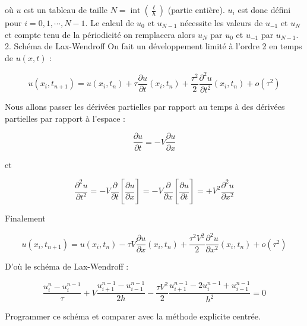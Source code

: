 \documentclass[10pt]{article}
\begin{document}
où \(u\) est un tableau de taille \(N=\operatorname{int}\left(\frac{\ell}{h}\right)\) (partie entière). \(u_{i}\) est donc défini pour \(i= 0,1, \cdots, N-1\). Le calcul de \(u_{0}\) et \(u_{N-1}\) nécessite les valeurs de \(u_{-1}\) et \(u_{N}\) et compte tenu de la périodicité on remplacera alors \(u_{N}\) par \(u_{0}\) et \(u_{-1}\) par \(u_{N-1}\).\\
2. Schéma de Lax-Wendroff On fait un développement limité à l'ordre 2 en temps de \(u(x, t)\) :

\[
u\left(x_{i}, t_{n+1}\right)=u\left(x_{i}, t_{n}\right)+\tau \frac{\partial u}{\partial t}\left(x_{i}, t_{n}\right)+\frac{\tau^{2}}{2} \frac{\partial^{2} u}{\partial t^{2}}\left(x_{i}, t_{n}\right)+o\left(\tau^{2}\right)
\]

Nous allons passer les dérivées partielles par rapport au temps à des dérivées partielles par rapport à l'espace :

\[
\frac{\partial u}{\partial t}=-V \frac{\partial u}{\partial x}
\]

et

\[
\frac{\partial^{2} u}{\partial t^{2}}=-V \frac{\partial}{\partial t}\left[\frac{\partial u}{\partial x}\right]=-V \frac{\partial}{\partial x}\left[\frac{\partial u}{\partial t}\right]=+V^{2} \frac{\partial^{2} u}{\partial x^{2}}
\]

Finalement

\[
u\left(x_{i}, t_{n+1}\right)=u\left(x_{i}, t_{n}\right)-\tau V \frac{\partial u}{\partial x}\left(x_{i}, t_{n}\right)+\frac{\tau^{2} V^{2}}{2} \frac{\partial^{2} u}{\partial x^{2}}\left(x_{i}, t_{n}\right)+o\left(\tau^{2}\right)
\]

D'où le schéma de Lax-Wendroff :

\[
\frac{u_{i}^{n}-u_{i}^{n-1}}{\tau}+V \frac{u_{i+1}^{n-1}-u_{i-1}^{n-1}}{2 h}-\frac{\tau V^{2}}{2} \frac{u_{i+1}^{n-1}-2 u_{i}^{n-1}+u_{i-1}^{n-1}}{h^{2}}=0
\]

Programmer ce schéma et comparer avec la méthode explicite centrée.
\end{document}
